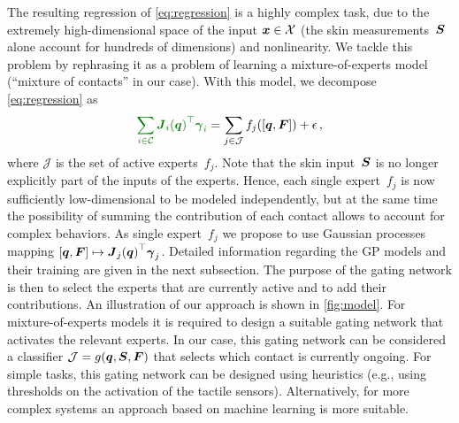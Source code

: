 	The resulting regression of \eq\eqref{eq:regression} is a highly complex task, due to the extremely high-dimensional space of the input $\boldsymbol x \in \mathcal{X}$ (the skin measurements~$\mathcal{\boldsymbol{S}}$ alone account for hundreds of dimensions) and nonlinearity.
    We tackle this problem by rephrasing it as a problem of learning a mixture-of-experts model (``mixture of contacts'' in our case).
	With this model, we decompose \eq\eqref{eq:regression} as
	\begin{align}
		\textcolor{darkgreen}{\sum_{i \in\mathcal{C}} {\jacobian_i(\q)}\T \extForces_i}  = \sum_{j\in\mathcal{J}} f_j([\q, \ftsForces]) + \epsilon\,,
		\label{eq:expertofmixtureregression}
	\end{align}
	where $\mathcal{J}$ is the set of active experts~$f_j$.
	Note that the skin input~$\mathcal{\boldsymbol{S}}$ is no longer explicitly part of the inputs of the experts. 
    Hence, each single expert~$f_j$ is now sufficiently low-dimensional to be modeled independently, but at the same time the possibility of summing the contribution of each contact allows to account for complex behaviors.
    As single expert~$f_j$ we propose to use Gaussian processes mapping $[\boldsymbol q, \boldsymbol{F}] \mapsto {\boldsymbol J_j(\boldsymbol q)}^\top \boldsymbol{\gamma}_j$.
    Detailed information regarding the GP models and their training are given in the next subsection.
    The purpose of the gating network is then to select the experts that are currently active and to add their contributions.    
    An illustration of our approach is shown in \fig\ref{fig:model}.
	For mixture-of-experts models it is required to design a suitable gating network that activates the relevant experts.
    In our case, this gating network can be considered a classifier $\mathcal{J} = g(\boldsymbol q, \mathcal{\boldsymbol{S}},\boldsymbol{F})$ that selects which contact is currently ongoing.
	For simple tasks, this gating network can be designed using heuristics (e.g., using thresholds on the activation of the tactile sensors). 
    Alternatively, for more complex systems an approach based on machine learning is more suitable. 



